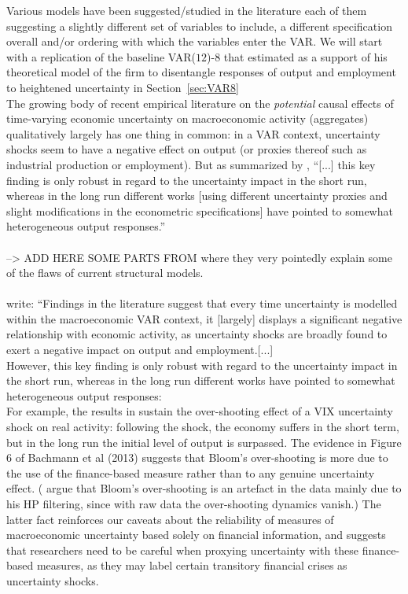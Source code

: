 \documentclass[a4paper,11pt,listof=nochaptergap,oneside,pointednumbers,bibtotoc,bigheadings,liststotoc,hidelinks]{scrbook}
\theoremstyle{mysatz}
\theoremstyle{mydefinition}
\theoremstyle{mytheorem}
\theoremstyle{mybemerkung}
\begin{document}
Various models have been suggested/studied in the literature each of them suggesting a slightly different set of variables to include, a different specification overall and/or ordering with which the variables enter the VAR. We will start with a replication of the baseline VAR($12$)-8 that \citet{bloom:09} estimated as a support of his theoretical model of the firm to disentangle responses of output and employment to heightened uncertainty in Section~\ref{sec:VAR8}
\\
The growing body of recent empirical literature on the \textit{potential} causal effects of time-varying economic uncertainty on macroeconomic activity (aggregates) qualitatively largely has one thing in common: in a VAR context, uncertainty shocks seem to have a negative effect on output (or proxies thereof such as industrial production or employment). But as summarized by \citet[p. 23]{bontempietal:16}, ``[...] this key finding is only robust in regard to the uncertainty impact in the short run, whereas in the long run different works [using different uncertainty proxies and slight modifications in the econometric specifications] have pointed to somewhat heterogeneous output responses.''\\
\\
--> ADD HERE SOME PARTS FROM \citet{ludvigsonetal:18} where they very pointedly explain some of the flaws of current structural models.\\
\\
\citet{bontempietal:16} write: ``Findings in the literature suggest that every time uncertainty is modelled within the macroeconomic VAR context, it [largely] displays a significant negative relationship with economic activity, as uncertainty shocks are broadly found to exert a negative impact on output and employment.[...] \\
	However, this key finding is only robust with regard to the uncertainty impact in the short run, whereas in the long run different works have pointed to somewhat heterogeneous output responses:\\
	For example, the results in \citet{bloom:09} sustain the over-shooting effect of a VIX uncertainty shock on real activity: following the shock, the economy suffers in the short term, but in the long run the initial level of output is surpassed. The evidence in Figure 6 of Bachmann et al (2013) suggests that Bloom's over-shooting is more due to the use of the finance-based measure rather than to any genuine uncertainty effect. (\citet{juradoetal:15} argue that Bloom's over-shooting is an artefact in the data mainly due to his HP filtering, since with raw data the over-shooting dynamics vanish.) The latter fact reinforces our caveats about the reliability of measures of macroeconomic uncertainty based solely on financial information, and suggests that researchers need to be careful when proxying uncertainty with these finance-based measures, as they may label certain transitory financial crises as uncertainty shocks.\\
\end{document}
